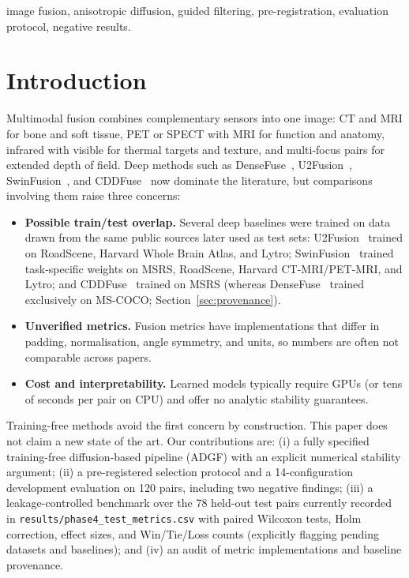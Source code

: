 \documentclass[conference]{IEEEtran}
\begin{document}
\begin{IEEEkeywords}
image fusion, anisotropic diffusion, guided filtering, pre-registration, evaluation protocol, negative results.
\end{IEEEkeywords}

\section{Introduction}
Multimodal fusion combines complementary sensors into one image: CT and MRI for bone and soft tissue, PET or SPECT with MRI for function and anatomy, infrared with visible for thermal targets and texture, and multi-focus pairs for extended depth of field. Deep methods such as DenseFuse~\cite{li2019densefuse}, U2Fusion~\cite{xu2022u2fusion}, SwinFusion~\cite{ma2022swinfusion}, and CDDFuse~\cite{zhao2023cddfuse} now dominate the literature, but comparisons involving them raise three concerns:
\begin{itemize}
    \item \textbf{Possible train/test overlap.} Several deep baselines were trained on data drawn from the same public sources later used as test sets: U2Fusion~\cite{xu2022u2fusion} trained on RoadScene, Harvard Whole Brain Atlas, and Lytro; SwinFusion~\cite{ma2022swinfusion} trained task-specific weights on MSRS, RoadScene, Harvard CT-MRI/PET-MRI, and Lytro; and CDDFuse~\cite{zhao2023cddfuse} trained on MSRS (whereas DenseFuse~\cite{li2019densefuse} trained exclusively on MS-COCO; Section~\ref{sec:provenance}).
    \item \textbf{Unverified metrics.} Fusion metrics have implementations that differ in padding, normalisation, angle symmetry, and units, so numbers are often not comparable across papers.
    \item \textbf{Cost and interpretability.} Learned models typically require GPUs (or tens of seconds per pair on CPU) and offer no analytic stability guarantees.
\end{itemize}

Training-free methods avoid the first concern by construction. This paper does not claim a new state of the art. Our contributions are: (i) a fully specified training-free diffusion-based pipeline (ADGF) with an explicit numerical stability argument; (ii) a pre-registered selection protocol and a 14-configuration development evaluation on 120 pairs, including two negative findings; (iii) a leakage-controlled benchmark over the 78 held-out test pairs currently recorded in \texttt{results/phase4\_test\_metrics.csv} with paired Wilcoxon tests, Holm correction, effect sizes, and Win/Tie/Loss counts (explicitly flagging pending datasets and baselines); and (iv) an audit of metric implementations and baseline provenance.
\end{document}
